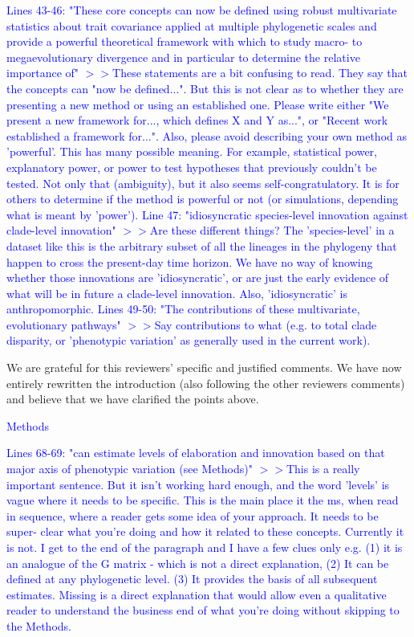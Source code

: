 \documentclass[12pt,letterpaper]{article}
\begin{document}
{\textcolor{blue}{Lines 43-46: "These core concepts can now be defined using robust multivariate statistics about trait covariance applied at multiple phylogenetic scales and provide a powerful theoretical framework with which to study macro- to megaevolutionary divergence and in particular to determine the relative importance of"
$>>$These statements are a bit confusing to read. They say that the concepts can "now be defined...". But this is not clear as to whether they are presenting a new method or using an established one. Please write either "We present a new framework for..., which defines X and Y as...", or "Recent work established a framework for...". Also, please avoid describing your own method as 'powerful'. This has many possible meaning. For example, statistical power, explanatory power, or power to test hypotheses that previously couldn't be tested. Not only that (ambiguity), but it also seems self-congratulatory. It is for others to determine if the method is powerful or not (or simulations, depending what is meant by 'power').
Line 47: "idiosyncratic species-level innovation against clade-level innovation"
$>>$Are these different things? The 'species-level' in a dataset like this is the arbitrary subset of all the lineages in the phylogeny that happen to cross the present-day time horizon. We have no way of knowing whether those innovations are 'idiosyncratic', or are just the early evidence of what will be in future a clade-level innovation. Also, 'idiosyncratic' is anthropomorphic.
Lines 49-50: "The contributions of these multivariate, evolutionary pathways"
$>>$Say contributions to what (e.g. to total clade disparity, or 'phenotypic variation' as generally used in the current work).}

We are grateful for this reviewers’ specific and justified comments. We have now entirely rewritten the introduction (also following the other reviewers comments) and believe that we have clarified the points above. 

\textcolor{blue}{Methods}

\textcolor{blue}{Lines 68-69: "can estimate levels of elaboration and innovation based on that major axis of phenotypic variation (see Methods)"
$>>$This is a really important sentence. But it isn't working hard enough, and the word 'levels' is vague where it needs to be specific. This is the main place it the ms, when read in sequence, where a reader gets some idea of your approach. It needs to be super- clear what you're doing and how it related to these concepts. Currently it is not. I get to the end of the paragraph and I have a few clues only e.g. (1) it is an analogue of the G matrix - which is not a direct explanation, (2) It can be defined at any phylogenetic level. (3) It provides the basis of all subsequent estimates. Missing is a direct explanation that would allow even a qualitative reader to understand the business end of what you're doing without skipping to the Methods.}

}
\end{document}
